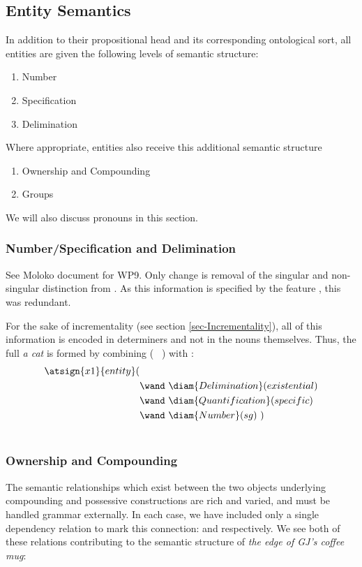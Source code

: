 \subsection{Entity Semantics}

In addition to their propositional head and its corresponding ontological sort, all entities are given the following levels of semantic structure: 
\begin{enumerate}
\item Number
\item Specification
\item Delimination
\end{enumerate}
Where appropriate, entities also receive this additional semantic structure
\begin{enumerate}
\item Ownership and  Compounding
\item Groups
\end{enumerate}
We will also discuss pronouns in this section.

\subsubsection{Number/Specification and Delimination}
See Moloko document for WP9. Only change is removal of the singular and non-singular distinction from . As this information is specified by the feature , this was redundant.

For the sake of incrementality (see section \ref{sec-Incrementality}), all of this information is encoded in determiners and not in the nouns themselves. Thus, the full  \emph{a cat} is formed by combining (  \ )  with : 
\begin{align*}
\atsign{x1}{entity}(&  \\ 
      & \wand\ \diam{Delimination}(existential) \\
      & \wand\ \diam{Quantification}(specific) \\
      & \wand\ \diam{Number}(sg) \ ) \\ \\
\end{align*} 


\subsubsection{Ownership and Compounding}
The semantic relationships which exist between the two objects underlying compounding and possessive constructions are rich and varied, and must be handled grammar externally. In each case, we have included only a single dependency relation to mark this connection:  and  respectively. We see both of these relations contributing to  the semantic structure of \emph{the edge of GJ's coffee mug}: 
\vspace{-1.5em} 

